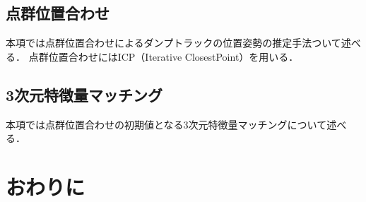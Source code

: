 \newpage

\subsection{点群位置合わせ}
本項では点群位置合わせによるダンプトラックの位置姿勢の推定手法ついて述べる．
点群位置合わせにはICP（Iterative ClosestPoint）を用いる．


\newpage

\subsection{3次元特徴量マッチング}
本項では点群位置合わせの初期値となる3次元特徴量マッチングについて述べる．

\newpage

\section{おわりに}

\newpage